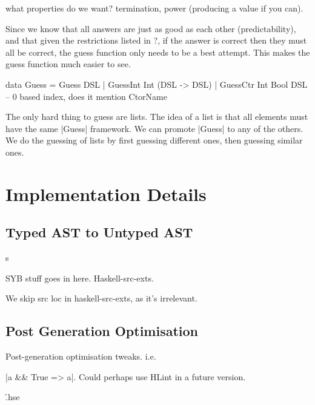 \documentclass[preprint]{sigplanconf}
\begin{document}
what properties do we want? termination, power (producing a value if you can).

Since we know that all answers are just as good as each other (predictability), and that given the restrictions listed in ?, if the answer is correct then they must all be correct, the guess function only needs to be a best attempt. This makes the guess function much easier to see.

\begin{code}
data Guess = Guess DSL
           | GuessInt Int (DSL -> DSL)
           | GuessCtr Int Bool DSL  -- 0 based index, does it mention CtorName
\end{code}

The only hard thing to guess are lists. The idea of a list is that all elements must have the same |Guess| framework. We can promote |Guess| to any of the others. We do the guessing of lists by first guessing different ones, then guessing similar ones.

\section{Implementation Details}
\label{sec:implementation}

\subsection{Typed AST to Untyped AST}s
\label{sec:universe}

SYB stuff goes in here. Haskell-src-exts.

We skip src loc in haskell-src-exts, as it's irrelevant.

\subsection{Post Generation Optimisation}

Post-generation optimisation tweaks. i.e. \ignore|a && True => a|. Could perhaps use HLint in a future version.

\h{.hse}
\end{document}

